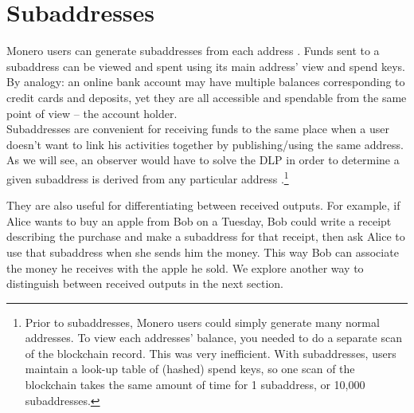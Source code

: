 \section{Subaddresses}
\label{sec:subaddresses}

Monero users can generate subaddresses from each address \cite{MRL-0006}. Funds sent to a subaddress can be viewed and spent using its main address’ view and spend keys. By analogy: an online bank account may have multiple balances corresponding to credit cards and deposits, yet they are all accessible and spendable from the same point of view – the account holder.\\

Subaddresses are convenient for receiving funds to the same place when a user doesn’t want to link his activities together by publishing/using the same address. As we will see, an observer would have to solve the DLP in order to determine a given subaddress is derived from any particular address \cite{MRL-0006}.\footnote{Prior to subaddresses, Monero users could simply generate many normal addresses. To view each addresses' balance, you needed to do a separate scan of the blockchain record. This was very inefficient. With subaddresses, users maintain a look-up table of (hashed) spend keys, so one scan of the blockchain takes the same amount of time for 1 subaddress, or 10,000 subaddresses.}

They are also useful for differentiating between received outputs. For example, if Alice wants to buy an apple from Bob on a Tuesday, Bob could write a receipt describing the purchase and make a subaddress for that receipt, then ask Alice to use that subaddress when she sends him the money. This way Bob can associate the money he receives with the apple he sold. We explore another way to distinguish between received outputs in the next section.%

